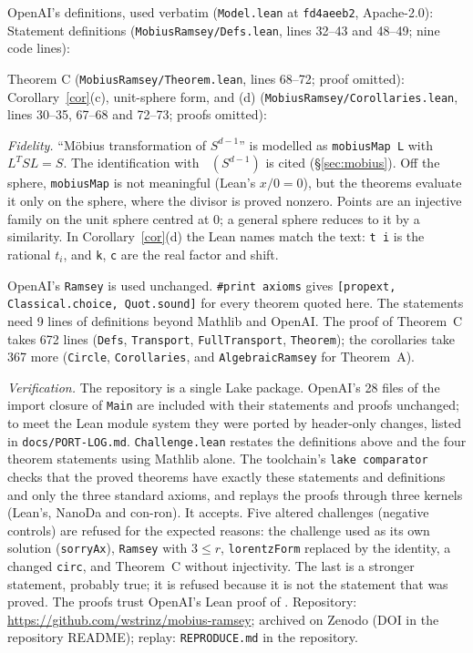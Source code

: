 \documentclass[11pt]{amsart}
\DeclareMathOperator{\Mob}{M\ddot{o}b}
\theoremstyle{plain}
\theoremstyle{definition}
\begin{document}
OpenAI's definitions, used verbatim (\texttt{Model.lean} at \texttt{fd4aeeb2}, Apache-2.0):
{\small}
\noindent Statement definitions (\texttt{MobiusRamsey/Defs.lean}, lines 32--43 and 48--49;
nine code lines):
{\small}
{\small}

\noindent Theorem C (\texttt{MobiusRamsey/Theorem.lean}, lines 68--72; proof omitted):
{\small}
\noindent Corollary~\ref{cor}(c), unit-sphere form, and (d)
(\texttt{MobiusRamsey/Corollaries.lean}, lines 30--35, 67--68 and 72--73; proofs omitted):
{\small}
{\small}
{\small}

\noindent\emph{Fidelity.} ``M\"obius transformation of $S^{d-1}$'' is modelled as
\texttt{mobiusMap L} with $L^TSL=S$. The identification with $\Mob(S^{d-1})$ is cited
(\S\ref{sec:mobius}). Off the sphere, \texttt{mobiusMap} is not meaningful (Lean's $x/0=0$), but
the theorems evaluate it only on the sphere, where the divisor is proved nonzero. Points are an
injective family on the unit sphere centred at $0$; a general sphere reduces to it by a
similarity. In Corollary~\ref{cor}(d) the Lean names match the text: \texttt{t i} is the
rational $t_i$, and \texttt{k}, \texttt{c} are the real factor and shift.

OpenAI's \texttt{Ramsey} is used unchanged.
\texttt{\#print axioms} gives \texttt{[propext, Classical.choice, Quot.sound]} for every theorem
quoted here. The statements need 9 lines of definitions beyond Mathlib and OpenAI. The proof of
Theorem~C takes 672 lines (\texttt{Defs}, \texttt{Transport}, \texttt{FullTransport},
\texttt{Theorem}); the corollaries take 367 more (\texttt{Circle}, \texttt{Corollaries}, and
\texttt{AlgebraicRamsey} for Theorem~A).

\smallskip\noindent\emph{Verification.} The repository is a single Lake package. OpenAI's 28
files of the import closure of \texttt{Main} are included with their statements and proofs
unchanged; to meet the Lean module system they were ported by header-only changes, listed in
\texttt{docs/PORT-LOG.md}. \texttt{Challenge.lean} restates the definitions above and the four
theorem statements using Mathlib alone. The toolchain's \texttt{lake comparator} \cite{Comparator}
checks that the proved theorems have exactly these statements and definitions and only the three
standard axioms, and replays the proofs through three kernels (Lean's, NanoDa and con-ron). It
accepts. Five altered challenges (negative controls) are refused for the expected reasons: the
challenge used as its own solution (\texttt{sorryAx}), \texttt{Ramsey} with $3\le r$,
\texttt{lorentzForm} replaced by the identity, a changed \texttt{circ}, and Theorem~C without
injectivity. The last is a stronger statement, probably true; it is refused because it is not the
statement that was proved. The proofs trust
OpenAI's Lean proof of \cite{OAI172}. Repository: \url{https://github.com/wstrinz/mobius-ramsey}; archived on Zenodo (DOI in the repository README); replay: \texttt{REPRODUCE.md} in the repository.
\end{document}
